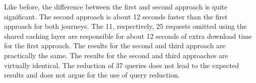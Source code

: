 \noindent Like before, the difference between the first and second approach is quite significant. The second approach is about 12 seconds faster than the first approach for both journeys. The 11, respectively, 25 requests omitted using the shared caching layer are responsible for about 12 seconds of extra download time for the first approach. The results for the second and third approach are practically the same. The results for the second and third approaches are virtually identical. The reduction of 37 queries does not lead to the expected results and does not argue for the use of query reduction.